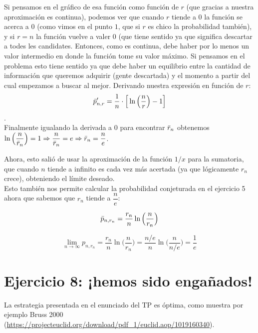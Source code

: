 \documentclass[a4paper]{article}
\begin{document}
Si pensamos en el gráfico de esa función como función de $r$ (que gracias a nuestra aproximación es continua), podemos ver que cuando $r$ tiende a $0$ la función se acerca a $0$ (como vimos en el punto $1$, que si $r$ es chico la probabilidad también), y si $r = n$ la función vuelve a valer $0$ (que tiene sentido ya que significa descartar a todes les candidates. Entonces, como es continua, debe haber por lo menos un valor intermedio en donde la función tome su valor máximo. Si pensamos en el problema esto tiene sentido ya que debe haber un equilibrio entre la cantidad de información que queremos adquirir (gente descartada) y el momento a partir del cual empezamos a buscar al mejor.
Derivando nuestra expresión en función de $r$:\\

$$\Bar{p}_{n,r}' = \dfrac{1}{n} \cdot \Big[\ln\Big(\dfrac{n}{r}\Big) - 1\Big]$$.
\\

Finalmente igualando la derivada a $0$ para encontrar $\Bar{r}_n$ obtenemos $\ln\Big(\dfrac{n}{\Bar{r}_n}\Big) = 1 \Rightarrow \dfrac{n}{\Bar{r}_n} = e \Rightarrow \Bar{r}_n = \dfrac{n}{e}$.

Ahora, esto salió de usar la aproximación de la función $1/x$ para la sumatoria, que cuando $n$ tiende a infinito es cada vez más acertada (ya que lógicamente $r_n$ crece), obteniendo el límite deseado.\\


Esto también nos permite calcular la probabilidad conjeturada en el ejercicio 5 ahora que sabemos que $r_n$ tiende a $\dfrac{n}{e}$:

$$\Bar{p}_{n,r_n} = \dfrac{r_n}{n} \ln\Big(\dfrac{n}{r_n}\Big)$$

$$\lim_{n \rightarrow \infty} p_{n,r_n} = \dfrac{r_n}{n} \ln\Big(\dfrac{n}{r_n}\Big) = \dfrac{n/e}{n} \ln\Big(\dfrac{n}{n/e}\Big) = \dfrac{1}{e}$$

\section*{Ejercicio 8: ¡hemos sido engañados!}

La estrategia presentada en el enunciado del TP es óptima, como muestra por ejemplo Bruss 2000 (\url{https://projecteuclid.org/download/pdf_1/euclid.aop/1019160340}).
\end{document}

